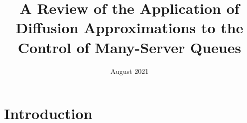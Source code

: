 \documentclass{article}
\title{A Review of the Application of Diffusion Approximations to the Control of Many-Server Queues}
\author{}
\date{August 2021}
\begin{document}
\maketitle

\section{Introduction}
\end{document}
